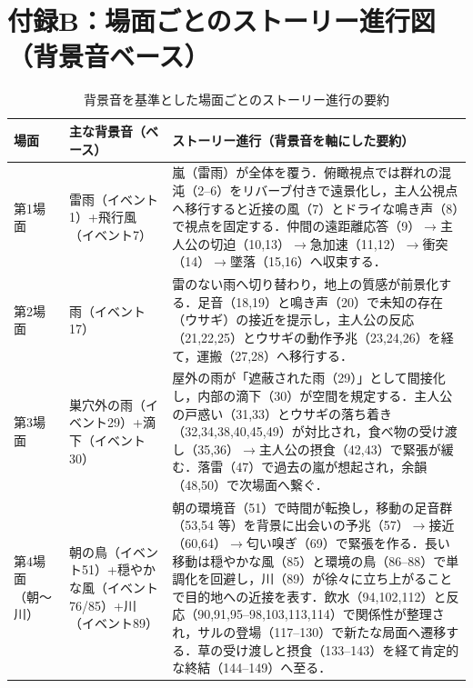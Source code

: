 \section*{付録B：場面ごとのストーリー進行図（背景音ベース）}
\begin{table}[h]
	\centering
	\small
	\caption{背景音を基準とした場面ごとのストーリー進行の要約}
	\begin{tabular}{p{1.8cm} p{4.4cm} p{8.6cm}}
		\hline
		\textbf{場面} & \textbf{主な背景音（ベース）}                    & \textbf{ストーリー進行（背景音を軸にした要約）}                                                                                                                                                                                                                                               \\
		\hline
		第1場面        & 雷雨（イベント1）+飛行風（イベント7）                   & 嵐（雷雨）が全体を覆う．俯瞰視点では群れの混沌（2--6）をリバーブ付きで遠景化し，主人公視点へ移行すると近接の風（7）とドライな鳴き声（8）で視点を固定する．仲間の遠距離応答（9）$\to$主人公の切迫（10,13）$\to$急加速（11,12）$\to$衝突（14）$\to$墜落（15,16）へ収束する．                                                                                                                \\
		第2場面        & 雨（イベント17）                              & 雷のない雨へ切り替わり，地上の質感が前景化する．足音（18,19）と鳴き声（20）で未知の存在（ウサギ）の接近を提示し，主人公の反応（21,22,25）とウサギの動作予兆（23,24,26）を経て，運搬（27,28）へ移行する．                                                                                                                                                         \\
		第3場面        & 巣穴外の雨（イベント29）+滴下（イベント30）               & 屋外の雨が「遮蔽された雨（29）」として間接化し，内部の滴下（30）が空間を規定する．主人公の戸惑い（31,33）とウサギの落ち着き（32,34,38,40,45,49）が対比され，食べ物の受け渡し（35,36）$\to$主人公の摂食（42,43）で緊張が緩む．落雷（47）で過去の嵐が想起され，余韻（48,50）で次場面へ繋ぐ．                                                                                                      \\
		第4場面（朝〜川）   & 朝の鳥（イベント51）+穏やかな風（イベント76/85）+川（イベント89） & 朝の環境音（51）で時間が転換し，移動の足音群（53,54 等）を背景に出会いの予兆（57）$\to$接近（60,64）$\to$匂い嗅ぎ（69）で緊張を作る．長い移動は穏やかな風（85）と環境の鳥（86--88）で単調化を回避し，川（89）が徐々に立ち上がることで目的地への近接を表す．飲水（94,102,112）と反応（90,91,95--98,103,113,114）で関係性が整理され，サルの登場（117--130）で新たな局面へ遷移する．草の受け渡しと摂食（133--143）を経て肯定的な終結（144--149）へ至る． \\

\end{tabular}
\end{table}
